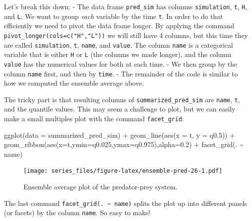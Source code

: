\documentclass[
]{book}
\newenvironment{Shaded}{\begin{snugshade}}{\end{snugshade}}
\newcommand{\AttributeTok}[1]{\textcolor[rgb]{0.77,0.63,0.00}{#1}}
\newcommand{\FloatTok}[1]{\textcolor[rgb]{0.00,0.00,0.81}{#1}}
\newcommand{\FunctionTok}[1]{\textcolor[rgb]{0.00,0.00,0.00}{#1}}
\newcommand{\NormalTok}[1]{#1}
\newcommand{\SpecialCharTok}[1]{\textcolor[rgb]{0.00,0.00,0.00}{#1}}
\theoremstyle{definition}
\theoremstyle{definition}
\theoremstyle{definition}
\theoremstyle{remark}
\begin{document}
Let's break this down:
- The data frame \texttt{pred\_sim} has columns \texttt{simulation}, \texttt{t}, \texttt{H}, and \texttt{L}. We want to group \emph{each} variable by the time \texttt{t}. In order to do that efficiently we need to pivot the data frame longer. By applying the command \texttt{pivot\_longer(cols=c("H","L"))} we will still have 4 columns, but this time they are called \texttt{simulation}, \texttt{t}, \texttt{name}, and \texttt{value}. The column \texttt{name} is a categorical variable that is either \texttt{H} or \texttt{L} (the columns we made longer), and the column \texttt{value} has the numerical values for both at each time.
- We then group by the column \texttt{name} first, and then by \texttt{time}.
- The remainder of the code is similar to how we computed the ensemble average above.

The tricky part is that resulting columns of \texttt{summarized\_pred\_sim} are \texttt{name}, \texttt{t}, and the quantile values. This may seem a challenge to plot, but we can easily make a small multiples plot with the command \texttt{facet\_grid}:

\begin{Shaded}
\begin{Highlighting}[]
\FunctionTok{ggplot}\NormalTok{(}\AttributeTok{data =}\NormalTok{ summarized\_pred\_sim) }\SpecialCharTok{+}
  \FunctionTok{geom\_line}\NormalTok{(}\FunctionTok{aes}\NormalTok{(}\AttributeTok{x =}\NormalTok{ t, }\AttributeTok{y =}\NormalTok{ q0}\FloatTok{.5}\NormalTok{)) }\SpecialCharTok{+}
  \FunctionTok{geom\_ribbon}\NormalTok{(}\FunctionTok{aes}\NormalTok{(}\AttributeTok{x=}\NormalTok{t,}\AttributeTok{ymin=}\NormalTok{q0}\FloatTok{.025}\NormalTok{,}\AttributeTok{ymax=}\NormalTok{q0}\FloatTok{.975}\NormalTok{),}\AttributeTok{alpha=}\FloatTok{0.2}\NormalTok{) }\SpecialCharTok{+}
  \FunctionTok{facet\_grid}\NormalTok{(. }\SpecialCharTok{\textasciitilde{}}\NormalTok{ name)}
\end{Highlighting}
\end{Shaded}

\begin{figure}
\centering
\texttt{[image: series\_files/figure-latex/ensemble-pred-26-1.pdf]}
\caption{\label{fig:ensemble-pred-26}Ensemble average plot of the predator-prey system.}
\end{figure}

The last command \texttt{facet\_grid(.\ \textasciitilde{}\ name)} splits the plot up into different panels (or facets) by the column \texttt{name}. So easy to make!
\end{document}

